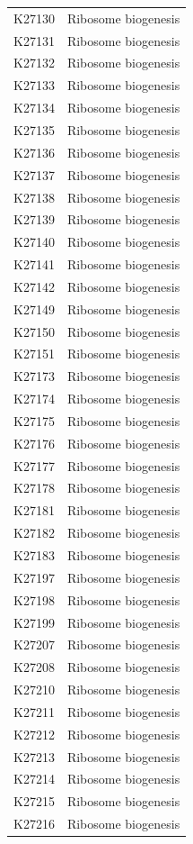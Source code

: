 \begin{longtable}{@{}l l@{}}
K27130 & Ribosome biogenesis \\
K27131 & Ribosome biogenesis \\
K27132 & Ribosome biogenesis \\
K27133 & Ribosome biogenesis \\
K27134 & Ribosome biogenesis \\
K27135 & Ribosome biogenesis \\
K27136 & Ribosome biogenesis \\
K27137 & Ribosome biogenesis \\
K27138 & Ribosome biogenesis \\
K27139 & Ribosome biogenesis \\
K27140 & Ribosome biogenesis \\
K27141 & Ribosome biogenesis \\
K27142 & Ribosome biogenesis \\
K27149 & Ribosome biogenesis \\
K27150 & Ribosome biogenesis \\
K27151 & Ribosome biogenesis \\
K27173 & Ribosome biogenesis \\
K27174 & Ribosome biogenesis \\
K27175 & Ribosome biogenesis \\
K27176 & Ribosome biogenesis \\
K27177 & Ribosome biogenesis \\
K27178 & Ribosome biogenesis \\
K27181 & Ribosome biogenesis \\
K27182 & Ribosome biogenesis \\
K27183 & Ribosome biogenesis \\
K27197 & Ribosome biogenesis \\
K27198 & Ribosome biogenesis \\
K27199 & Ribosome biogenesis \\
K27207 & Ribosome biogenesis \\
K27208 & Ribosome biogenesis \\
K27210 & Ribosome biogenesis \\
K27211 & Ribosome biogenesis \\
K27212 & Ribosome biogenesis \\
K27213 & Ribosome biogenesis \\
K27214 & Ribosome biogenesis \\
K27215 & Ribosome biogenesis \\
K27216 & Ribosome biogenesis \\

\end{longtable}
